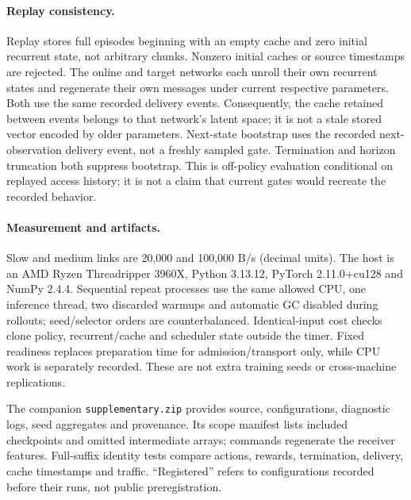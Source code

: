 \documentclass[10pt]{article}
\begin{document}
\paragraph{Replay consistency.} Replay stores full episodes beginning with an empty cache and zero initial recurrent state, not arbitrary chunks. Nonzero initial caches or source timestamps are rejected. The online and target networks each unroll their own recurrent states and regenerate their own messages under current respective parameters. Both use the same recorded delivery events. Consequently, the cache retained between events belongs to that network's latent space; it is not a stale stored vector encoded by older parameters. Next-state bootstrap uses the recorded next-observation delivery event, not a freshly sampled gate. Termination and horizon truncation both suppress bootstrap. This is off-policy evaluation conditional on replayed access history; it is not a claim that current gates would recreate the recorded behavior.

\paragraph{Measurement and artifacts.}
Slow and medium links are 20,000 and 100,000 B/s (decimal units). The host is an AMD Ryzen Threadripper 3960X, Python 3.13.12, PyTorch 2.11.0+cu128 and NumPy 2.4.4. Sequential repeat processes use the same allowed CPU, one inference thread, two discarded warmups and automatic GC disabled during rollouts; seed/selector orders are counterbalanced. Identical-input cost checks clone policy, recurrent/cache and scheduler state outside the timer. Fixed readiness replaces preparation time for admission/transport only, while CPU work is separately recorded. These are not extra training seeds or cross-machine replications.

The companion \texttt{supplementary.zip} provides source, configurations, diagnostic logs, seed aggregates and provenance. Its scope manifest lists included checkpoints and omitted intermediate arrays; commands regenerate the receiver features. Full-suffix identity tests compare actions, rewards, termination, delivery, cache timestamps and traffic. ``Registered'' refers to configurations recorded before their runs, not public preregistration.
\end{document}
